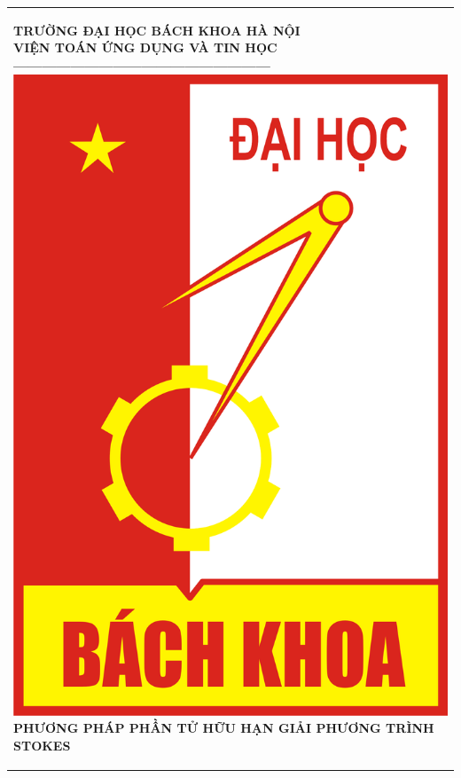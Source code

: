 \documentclass[14pt]{extreport}
\begin{document}
\newcommand{\Khung}[2]{
\begin{tabular}{|l|}
\hline\rule[-2ex]{0pt}{5.5ex}
\parbox{#1}{#2}\\
\hline
\end{tabular}
}

\Khung{.92\textwidth}{

\begin{center}
\normalsize
\textbf{TRƯỜNG ĐẠI HỌC BÁCH KHOA HÀ NỘI}\\
\normalsize
\textbf{VIỆN TOÁN ỨNG DỤNG VÀ TIN HỌC}\\
\textbf{------------------------------------------------------}\\[0.4cm]
\includegraphics[scale=.2]{logobkdentrang}\\[1.2cm]
\textbf{{\large PHƯƠNG PHÁP PHẦN TỬ HỮU HẠN GIẢI PHƯƠNG TRÌNH STOKES}}\\

\end{center}}
\end{document}
